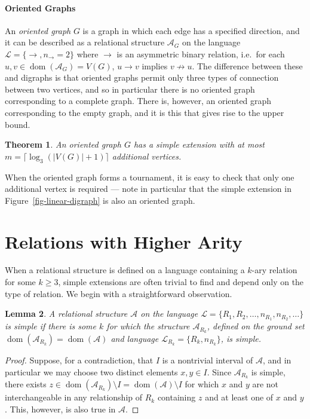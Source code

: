 \documentclass[11pt]{article}
\newtheorem{theorem}{Theorem}[section]
\newtheorem{lemma}[theorem]{Lemma}
\begin{document}
\paragraph{Oriented Graphs}
An {\it oriented graph} $G$ is a graph in which each edge has a specified direction, and it can be described as a relational structure $\mathcal{A}_G$ on the language $\mathcal{L}=\{\rightarrow, n_\rightarrow=2\}$ where $\rightarrow$ is an asymmetric binary relation, i.e.\ for each $u,v\in{\operatorname{dom}}(\mathcal{A}_G)=V(G)$, $u\rightarrow v$ implies $v\not\rightarrow u$. The difference between these and digraphs is that oriented graphs permit only three types of connection between two vertices, and so in particular there is no oriented graph corresponding to a complete graph. There is, however, an oriented graph corresponding to the empty graph, and it is this that gives rise to the upper bound.

\begin{theorem}
An oriented graph $G$ has a simple extension with at most $m=\lceil\log_3(|V(G)|+1)\rceil$ additional vertices.
\end{theorem}

When the oriented graph forms a tournament, it is easy to check that only one additional vertex is required --- note in particular that the simple extension in Figure~\ref{fig-linear-digraph} is also an oriented graph.

\section{Relations with Higher Arity}\label{sec-higher-arity}

When a relational structure is defined on a language containing a $k$-ary relation for some $k\geq 3$, simple extensions are often trivial to find and depend only on the type of relation. We begin with a straightforward observation.

\begin{lemma}\label{lem-one-relation-will-do}
A relational structure ${\mathcal{A}}$ on the language ${\mathcal{L}}=\{ R_1,R_2,\ldots, n_{R_1}, n_{R_2},\ldots \}$ is simple if there is some $k$ for which the structure ${\mathcal{A}}_{R_k}$, defined on the ground set ${\operatorname{dom}}({\mathcal{A}}_{R_k})={\operatorname{dom}}({\mathcal{A}})$ and language ${\mathcal{L}}_{R_k}=\{R_k,n_{R_k}\}$, is simple. \end{lemma}

\begin{proof}
Suppose, for a contradiction, that $I$ is a nontrivial interval of ${\mathcal{A}}$, and in particular we may choose two distinct elements $x,y\in I$. Since ${\mathcal{A}}_{R_k}$ is simple, there exists $z\in {\operatorname{dom}}({\mathcal{A}}_{R_k})\setminus I={\operatorname{dom}}({\mathcal{A}})\setminus I$ for which $x$ and $y$ are not interchangeable in any relationship of $R_k$ containing $z$ and at least one of $x$ and $y$. This, however, is also true in ${\mathcal{A}}$.\end{proof}
\end{document}
